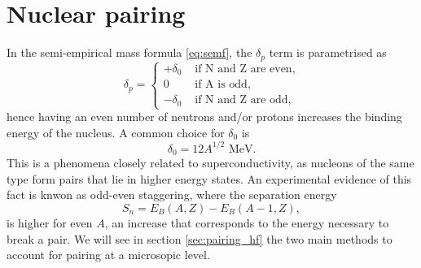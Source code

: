\section{Nuclear pairing}
\label{sec:pairing_intro}
In the semi-empirical mass formula \eqref{eq:semf}, the $\delta_p$ term is parametrised as 
\begin{equation}
    \delta_p = \begin{cases}
        +\delta_0 & \text{ if N and Z are even}, \\
        0 & \text{ if A is odd}, \\
        -\delta_0 & \text{ if N and Z are odd},
    \end{cases}
\end{equation}
hence having an even number of neutrons and/or protons increases the binding energy of the nucleus. A common choice for $\delta_0$ is
\begin{equation*}
\delta_0 = 12 A^{1/2}\text{ MeV}.
\end{equation*}
This is a phenomena closely related to superconductivity, as nucleons of the same type form pairs that lie in higher energy states. An experimental evidence of this fact is knwon as odd-even staggering, where the separation energy
\begin{equation}
    S_n = E_B(A, Z) - E_B(A-1, Z),
\end{equation}
is higher for even $A$, an increase that corresponds to the energy necessary to break a pair. We will see in section \ref{sec:pairing_hf} the two main methods to account for pairing at a microsopic level.


